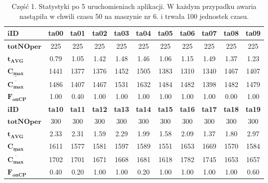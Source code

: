 \documentclass[archivemode]{mgr}
\begin{document}
\begin{table}[ht]
\renewcommand{\arraystretch}{1.2}
\begin{tabularx}{\textwidth}{|X|c|c|c|c|c|c|c|c|c|c|}
\hline
$\mathbf{iID}$ & \textbf{ta00} & \textbf{ta01} & \textbf{ta02} & \textbf{ta03} & \textbf{ta04} & \textbf{ta05} & \textbf{ta06} & \textbf{ta07} & \textbf{ta08} & \textbf{ta09}\\
\hline
$\mathbf{totNOper}$ & 225 & 225 & 225 & 225 & 225 & 225 & 225 & 225 & 225 & 225\\
\hline
$\mathbf{t_{AVG}}$ & 0.79 & 1.05 & 1.42 & 1.48 & 1.46 & 1.06 & 1.15 & 1.49 & 1.37 & 1.23\\
\hline
$\mathbf{\underline{C_{max}}}$ & 1441 & 1377 & 1376 & 1452 & 1505 & 1383 & 1310 & 1340 & 1467 & 1407\\
\hline
$\mathbf{\overline{C_{max}}}$ & 1486 & 1407 & 1467 & 1531 & 1632 & 1484 & 1482 & 1398 & 1482 & 1479\\
\hline
$\mathbf{F_{onCP}}$ & 1.00 & 0.40 & 1.00 & 1.00 & 1.00 & 1.00 & 1.00 & 1.00 & 0.00 & 1.00\\
\hline
\hline
$\mathbf{iID}$ & \textbf{ta10} & \textbf{ta11} & \textbf{ta12} & \textbf{ta13} & \textbf{ta14} & \textbf{ta15} & \textbf{ta16} & \textbf{ta17} & \textbf{ta18} & \textbf{ta19}\\
\hline
$\mathbf{totNOper}$ & 300 & 300 & 300 & 300 & 300 & 300 & 300 & 300 & 300 & 300\\
\hline
$\mathbf{t_{AVG}}$ & 2.33 & 2.31 & 1.59 & 2.29 & 1.99 & 1.58 & 2.09 & 1.37 & 1.80 & 2.97\\
\hline
$\mathbf{\underline{C_{max}}}$ & 1611 & 1577 & 1581 & 1597 & 1589 & 1551 & 1653 & 1669 & 1570 & 1584\\
\hline
$\mathbf{\overline{C_{max}}}$ & 1702 & 1701 & 1671 & 1668 & 1681 & 1618 & 1782 & 1745 & 1653 & 1657\\
\hline
$\mathbf{F_{onCP}}$ & 0.40 & 0.20 & 1.00 & 1.00 & 0.20 & 1.00 & 1.00 & 1.00 & 1.00 & 0.60\\
\hline
\end{tabularx}
\caption{Część 1. Statystyki po 5 uruchomieniach aplikacji. W każdym przypadku awaria nastąpiła w chwili czasu 50 na maszynie nr 6. i trwała 100 jednostek czasu.}
\label{tab_res_one}
\renewcommand{\arraystretch}{1.0}
\end{table}
%
\end{document}
